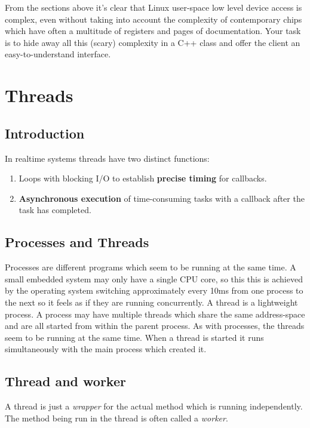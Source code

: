 \documentclass[12pt]{report}
\begin{document}
From the sections above it's clear that Linux user-space low level
device access is complex, even without taking into account the
complexity of contemporary chips which have often a multitude of
registers and pages of documentation. Your task is to hide away
all this (scary) complexity in a C++ class and offer the client
an easy-to-understand interface.





\chapter{Threads\label{threads}}

\section{Introduction}
In realtime systems threads have two distinct functions:
\begin{enumerate}
\item Loops with blocking I/O
  to establish \textbf{precise timing} for callbacks.
\item \textbf{Asynchronous execution} of time-consuming tasks
  with a callback after the task has completed.
\end{enumerate}


\section{Processes and Threads}
Processes are different programs which seem to be running at the same
time. A small embedded system may only have a single CPU core,
so this this is achieved by the operating system switching
approximately every 10ms from one process to the next so it feels as
if they are running concurrently. A thread is a lightweight
process. A process may have  multiple threads which share the same
address-space and are all started from
within the parent process. As with processes, the threads seem to be
running at the same time. When a thread is started it runs
simultaneously with the main process which created it.

\section{Thread and worker}
A thread is just a \textsl{wrapper} for the actual method
which is running independently. The method being run in the thread
is often called a \textsl{worker}.
\end{document}
